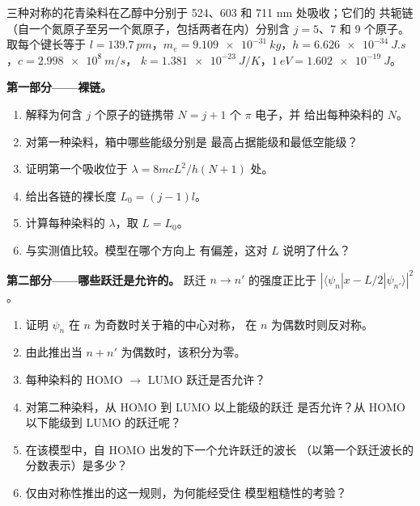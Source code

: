 \begin{problem}
\label{pb:b3:quantum-model-systems:1}
三种对称的花青染料在乙醇中分别于 524、603 和 711 nm 处吸收；它们的
共轭链（自一个氮原子至另一个氮原子，包括两者在内）分别含 $j = 5$、7
和 9 个原子。取每个键长等于 $l = \qty{139.7}{pm}$，$m_e =
\qty{9.109e-31}{kg}$，$h = \qty{6.626e-34}{J.s}$，$c = \qty{2.998e8}{m/s}$，
$k = \qty{1.381e-23}{J/K}$，$\qty{1}{eV} = \qty{1.602e-19}{J}$。

\medskip\noindent\textbf{第一部分——裸链。}
\begin{enumerate}
  \item 解释为何含 $j$ 个原子的链携带 $N = j + 1$ 个 $\pi$ 电子，并
        给出每种染料的 $N$。
  \item 对第一种染料，箱中哪些能级分别是
        最高占据能级和最低空能级？
  \item 证明第一个吸收位于 $\lambda = 8mcL^2/h(N+1)$ 处。
  \item 给出各链的裸长度 $L_0 = (j - 1)l$。
  \item 计算每种染料的 $\lambda$，取 $L = L_0$。
  \item 与实测值比较。模型在哪个方向上
        有偏差，这对 $L$ 说明了什么？
\end{enumerate}

\medskip\noindent\textbf{第二部分——哪些跃迁是允许的。}
跃迁 $n \to n'$ 的强度正比于 $|\langle
\psi_n|x - L/2|\psi_{n'}\rangle|^2$。
\begin{enumerate}[resume]
  \item 证明 $\psi_n$ 在 $n$ 为奇数时关于箱的中心对称，
        在 $n$ 为偶数时则反对称。
  \item 由此推出当 $n + n'$ 为偶数时，该积分为零。
  \item 每种染料的 HOMO $\to$ LUMO 跃迁是否允许？
  \item 对第二种染料，从 HOMO 到 LUMO 以上能级的跃迁
        是否允许？从 HOMO 以下能级到 LUMO 的跃迁呢？
  \item 在该模型中，自 HOMO 出发的下一个允许跃迁的波长
        （以第一个跃迁波长的分数表示）是多少？
  \item 仅由对称性推出的这一规则，为何能经受住
        模型粗糙性的考验？
\end{enumerate}


\end{problem}
